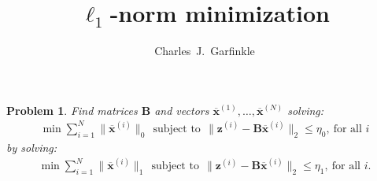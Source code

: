 \documentclass[journal, onecolumn]{IEEEtran}
\newtheorem{problem}{Problem}
\begin{document}
\title{$\ell_1$-norm minimization}
\author{Charles~J.~Garfinkle}

\maketitle

\begin{problem}\label{OptimizationProblem}
Find matrices $\mathbf{B}$ and vectors \mbox{$\mathbf{\overline x}^{(1)}, \ldots, \mathbf{\overline x}^{(N)}$} solving:
\begin{align}\label{minsum}
\min \sum_{i = 1}^N \|\mathbf{\overline x}^{(i)}\|_0 \ \
\text{subject to} \ \ \|\mathbf{z}^{(i)} - \mathbf{B}\mathbf{\overline x}^{(i)}\|_2 \leq \eta_0, \ \text{for all $i$}
\end{align}
by solving:
\begin{align}\label{minsum}
\min \sum_{i = 1}^N \|\mathbf{\overline x}^{(i)}\|_1 \ \
\text{subject to} \ \ \|\mathbf{z}^{(i)} - \mathbf{B}\mathbf{\overline x}^{(i)}\|_2 \leq \eta_1, \ \text{for all $i$}.
\end{align}
\end{problem}
\end{document}
